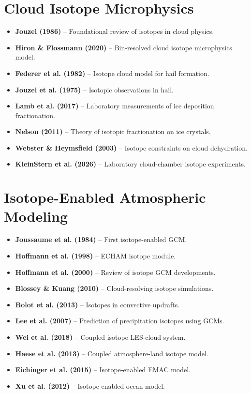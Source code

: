 \documentclass[11pt,a4paper]{article}
\begin{document}
\section{Cloud Isotope Microphysics}


\begin{itemize}
    \item \textbf{Jouzel (1986)} -- Foundational review of isotopes in cloud physics.
    \item \textbf{Hiron \& Flossmann (2020)} -- Bin-resolved cloud isotope microphysics model.
    \item \textbf{Federer et al. (1982)} -- Isotope cloud model for hail formation.
    \item \textbf{Jouzel et al. (1975)} -- Isotopic observations in hail.
    \item \textbf{Lamb et al. (2017)} -- Laboratory measurements of ice deposition fractionation.
    \item \textbf{Nelson (2011)} -- Theory of isotopic fractionation on ice crystals.
    \item \textbf{Webster \& Heymsfield (2003)} -- Isotope constraints on cloud dehydration.
    \item \textbf{KleinStern et al. (2026)} -- Laboratory cloud-chamber isotope experiments.
\end{itemize}

\section{Isotope-Enabled Atmospheric Modeling}


\begin{itemize}
    \item \textbf{Joussaume et al. (1984)} -- First isotope-enabled GCM.
    \item \textbf{Hoffmann et al. (1998)} -- ECHAM isotope module.
    \item \textbf{Hoffmann et al. (2000)} -- Review of isotope GCM developments.
    \item \textbf{Blossey \& Kuang (2010)} -- Cloud-resolving isotope simulations.
    \item \textbf{Bolot et al. (2013)} -- Isotopes in convective updrafts.
    \item \textbf{Lee et al. (2007)} -- Prediction of precipitation isotopes using GCMs.
    \item \textbf{Wei et al. (2018)} -- Coupled isotope LES-cloud system.
    \item \textbf{Haese et al. (2013)} -- Coupled atmosphere-land isotope model.
    \item \textbf{Eichinger et al. (2015)} -- Isotope-enabled EMAC model.
    \item \textbf{Xu et al. (2012)} -- Isotope-enabled ocean model.
\end{itemize}
\end{document}
